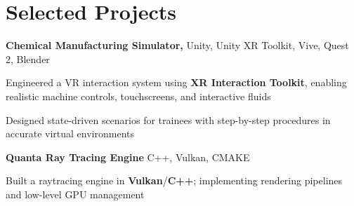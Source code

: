 
\newenvironment{twocolentry_proj}[2][]{
    \onecolentry
    \def\secondColumn{#2}
    \setcolumnwidth{\fill, 9 cm}
    \begin{paracol}{2}
}{
    \switchcolumn \raggedleft \secondColumn
    \end{paracol}
    \endonecolentry
} %

\vspace{5 pt - 0.3 cm}
\section{Selected Projects}
\begin{onecolentry}
\textbf{Chemical Manufacturing Simulator,} Unity, Unity XR Toolkit, Vive, Quest 2, Blender 
\end{onecolentry}

\vspace{0.10 cm}
\begin{onecolentry}
    \begin{highlights}
        \item Engineered a VR interaction system using \textbf{XR Interaction Toolkit}, enabling realistic machine controls, touchscreens, and interactive fluids
        \item Designed state-driven scenarios for trainees with step-by-step procedures in accurate virtual environments
    \end{highlights}
\end{onecolentry}   

\vspace{0.20 cm}
\begin{twocolentry_proj}{
    \mbox{}%
}
\fontsize{11 pt}{11 pt}\textbf{Quanta Ray Tracing Engine} C++, Vulkan, CMAKE
\end{twocolentry_proj}
\begin{onecolentry}
    \begin{highlights}
        \item Built a raytracing engine in \textbf{Vulkan}/\textbf{C++}; implementing rendering pipelines and low-level GPU management
    \end{highlights}
\end{onecolentry}
